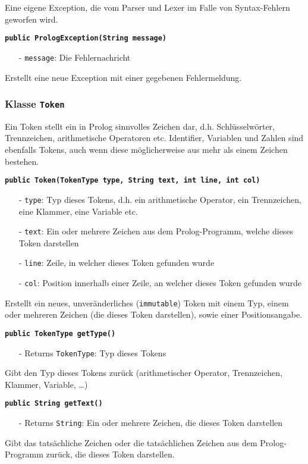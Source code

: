 \documentclass[parskip=full,11pt,twoside]{scrartcl}
\begin{document}
Eine eigene Exception, die vom Parser und Lexer im Falle von Syntax-Fehlern geworfen wird.

\textbf{\texttt{public PrologException(String message)}}
\begin{itemize}[noitemsep]
	\item[-] \texttt{message}: Die Fehlernachricht
\end{itemize}
Erstellt eine neue Exception mit einer gegebenen Fehlermeldung.

\subsubsection{Klasse \texttt{Token}}

Ein Token stellt ein in Prolog sinnvolles Zeichen dar, d.h. Schlüsselwörter, Trennzeichen, arithmetische Operatoren etc. Identifier, Variablen und Zahlen sind ebenfalls Tokens, auch wenn diese möglicherweise aus mehr als einem Zeichen bestehen.

\textbf{\texttt{public Token(TokenType type, String text, int line, int col)}}
\begin{itemize}[noitemsep]
	\item[-] \texttt{type}: Typ dieses Tokens, d.h. ein arithmetische Operator, ein Trennzeichen, eine Klammer, eine Variable etc.
	\item[-] \texttt{text}: Ein oder mehrere Zeichen aus dem Prolog-Programm, welche dieses Token darstellen
	\item[-] \texttt{line}: Zeile, in welcher dieses Token gefunden wurde
	\item[-] \texttt{col}: Position innerhalb einer Zeile, an welcher dieses Token gefunden wurde
\end{itemize}
Erstellt ein neues, unveränderliches (\texttt{immutable}) Token mit einem Typ, einem oder mehreren Zeichen (die dieses Token darstellen), sowie einer Positionsangabe.

\textbf{\texttt{public TokenType getType()}}
\begin{itemize}[noitemsep]
	\item[-] Returns \texttt{TokenType}: Typ dieses Tokens
\end{itemize}
Gibt den Typ dieses Tokens zurück (arithmetischer Operator, Trennzeichen, Klammer, Variable, \dots)

\textbf{\texttt{public String getText()}}
\begin{itemize}[noitemsep]
	\item[-] Returns \texttt{String}: Ein oder mehrere Zeichen, die dieses Token darstellen
\end{itemize}
Gibt das tatsächliche Zeichen oder die tatsächlichen Zeichen aus dem Prolog-Programm zurück, die dieses Token darstellen.
\end{document}
